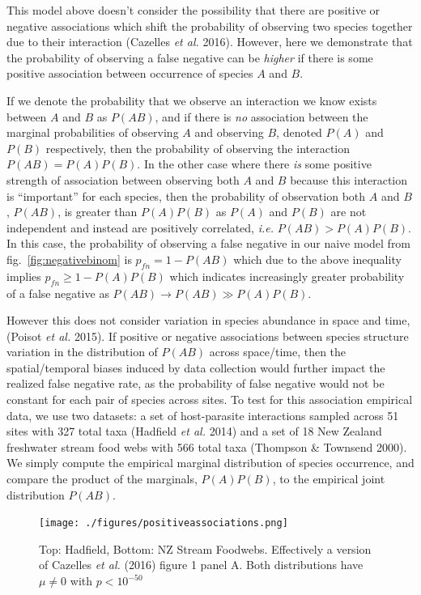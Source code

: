 \documentclass[10pt,oneside]{article}
\begin{document}
This model above doesn't consider the possibility that there are
positive or negative associations which shift the probability of
observing two species together due to their interaction (Cazelles
\emph{et al.} 2016). However, here we demonstrate that the probability
of observing a false negative can be \emph{higher} if there is some
positive association between occurrence of species \(A\) and \(B\).

If we denote the probability that we observe an interaction we know
exists between \(A\) and \(B\) as \(P(AB)\), and if there is \emph{no}
association between the marginal probabilities of observing \(A\) and
observing \(B\), denoted \(P(A)\) and \(P(B)\) respectively, then the
probability of observing the interaction \(P(AB) = P(A)P(B)\). In the
other case where there \emph{is} some positive strength of association
between observing both \(A\) and \(B\) because this interaction is
``important'' for each species, then the probability of observation both
\(A\) and \(B\), \(P(AB)\), is greater than \(P(A)P(B)\) as \(P(A)\) and
\(P(B)\) are not independent and instead are positively correlated,
\emph{i.e.} \(P(AB) > P(A)P(B)\). In this case, the probability of
observing a false negative in our naive model from
fig.~\ref{fig:negativebinom} is \(p_{fn} = 1 - P(AB)\) which due to the
above inequality implies \(p_{fn} \geq 1 - P(A)P(B)\) which indicates
increasingly greater probability of a false negative as
\(P(AB) \to P(AB) \gg P(A)P(B)\).

However this does not consider variation in species abundance in space
and time, (Poisot \emph{et al.} 2015). If positive or negative
associations between species structure variation in the distribution of
\(P(AB)\) across space/time, then the spatial/temporal biases induced by
data collection would further impact the realized false negative rate,
as the probability of false negative would not be constant for each pair
of species across sites. To test for this association empirical data, we
use two datasets: a set of host-parasite interactions sampled across 51
sites with 327 total taxa (Hadfield \emph{et al.} 2014) and a set of 18
New Zealand freshwater stream food webs with 566 total taxa (Thompson \&
Townsend 2000). We simply compute the empirical marginal distribution of
species occurrence, and compare the product of the marginals,
\(P(A)P(B)\), to the empirical joint distribution \(P(AB)\).

\begin{figure}
\hypertarget{fig:associations}{%
\centering
\texttt{[image: ./figures/positiveassociations.png]}
\caption{Top: Hadfield, Bottom: NZ Stream Foodwebs. Effectively a
version of Cazelles \emph{et al.} (2016) figure 1 panel A. Both
distributions have \(\mu \neq 0\) with
\(p < 10^{-50}\)}\label{fig:associations}
}
\end{figure}
\end{document}
